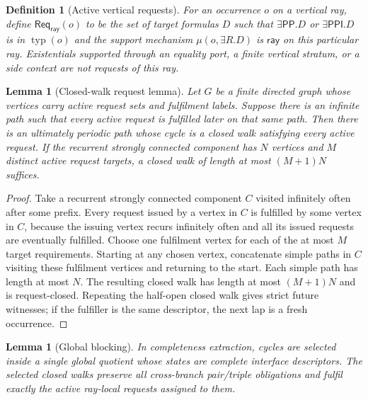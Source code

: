 \documentclass[11pt]{article}
\newtheorem{lemma}[theorem]{Lemma}
\newtheorem{definition}[theorem]{Definition}
\newcommand{\PP}{\mathsf{PP}}
\newcommand{\PPI}{\mathsf{PPI}}
\newcommand{\Req}{\mathsf{Req}}
\newcommand{\typ}{\operatorname{typ}}
\newcommand{\ray}{\mathsf{ray}}
\begin{document}
\begin{definition}[Active vertical requests]
For an occurrence $o$ on a vertical ray, define $\Req_{\ray}(o)$ to be the set of target formulas $D$ such that $\exists\PP.D$ or $\exists\PPI.D$ is in $\typ(o)$ and the support mechanism $\mu(o,\exists R.D)$ is $\ray$ on this particular ray.  Existentials supported through an equality port, a finite vertical stratum, or a side context are not requests of this ray.
\end{definition}

\begin{lemma}[Closed-walk request lemma]
\label{lem:closed-walk}
Let $G$ be a finite directed graph whose vertices carry active request sets and fulfilment labels.  Suppose there is an infinite path such that every active request is fulfilled later on that same path.  Then there is an ultimately periodic path whose cycle is a closed walk satisfying every active request.  If the recurrent strongly connected component has $N$ vertices and $M$ distinct active request targets, a closed walk of length at most $(M+1)N$ suffices.
\end{lemma}

\begin{proof}
Take a recurrent strongly connected component $C$ visited infinitely often after some prefix.  Every request issued by a vertex in $C$ is fulfilled by some vertex in $C$, because the issuing vertex recurs infinitely often and all its issued requests are eventually fulfilled.  Choose one fulfilment vertex for each of the at most $M$ target requirements.  Starting at any chosen vertex, concatenate simple paths in $C$ visiting these fulfilment vertices and returning to the start.  Each simple path has length at most $N$.  The resulting closed walk has length at most $(M+1)N$ and is request-closed.  Repeating the half-open closed walk gives strict future witnesses; if the fulfiller is the same descriptor, the next lap is a fresh occurrence.
\end{proof}

\begin{lemma}[Global blocking]
\label{lem:global-blocking}
In completeness extraction, cycles are selected inside a single global quotient whose states are complete interface descriptors.  The selected closed walks preserve all cross-branch pair/triple obligations and fulfil exactly the active ray-local requests assigned to them.
\end{lemma}
\end{document}
